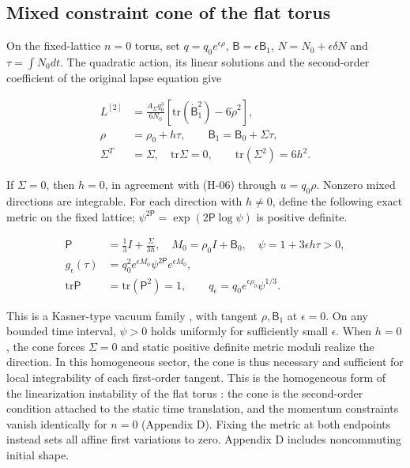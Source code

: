 \subsection{Mixed constraint cone of the flat torus}

On the fixed-lattice $n=0$ torus, set $q=q_0e^{\epsilon\rho}$, $\mathsf B=\epsilon\mathsf B_1$, $N=N_0+\epsilon\delta N$ and $\tau=\int N_0dt$. The quadratic action, its linear solutions and the second-order coefficient of the original lapse equation give

\begin{equation}\tag{S-01}\label{eq:S-01}
\begin{aligned}
L^{[2]}&=\frac{A_{\Sigma}q_0^3}{6N_0}\left[\mathrm{tr}(\dot{\mathsf B}_1^2)-6\dot\rho^2\right],\\
\rho&=\rho_0+h\tau,\qquad \mathsf B_1=\mathsf B_0+\Sigma\tau,\\
\Sigma^T&=\Sigma,\quad\mathrm{tr}\Sigma=0,\qquad \mathrm{tr}(\Sigma^2)=6h^2.
\end{aligned}
\end{equation}

If $\Sigma=0$, then $h=0$, in agreement with (H-06) through $u=q_0\rho$. Nonzero mixed directions are integrable. For each direction with $h\ne0$, define the following exact metric on the fixed lattice; $\psi^{2\mathsf P}=\exp(2\mathsf P\log\psi)$ is positive definite.

\begin{equation}\tag{S-02}\label{eq:S-02}
\begin{aligned}
\mathsf P&=\tfrac13 I+\frac{\Sigma}{3h},\quad M_0=\rho_0I+\mathsf B_0,\quad \psi=1+3\epsilon h\tau>0,\\
g_{\epsilon}(\tau)&=q_0^2e^{\epsilon M_0}\psi^{2\mathsf P}e^{\epsilon M_0},\\
\mathrm{tr}\mathsf P&=\mathrm{tr}(\mathsf P^2)=1,\qquad
q_{\epsilon}=q_0e^{\epsilon\rho_0}\psi^{1/3}.
\end{aligned}
\end{equation}

This is a Kasner-type vacuum family \cite{Kasner1921}, with tangent $\rho,\mathsf B_1$ at $\epsilon=0$. On any bounded time interval, $\psi>0$ holds uniformly for sufficiently small $\epsilon$. When $h=0$, the cone forces $\Sigma=0$ and static positive definite metric moduli realize the direction. In this homogeneous sector, the cone is thus necessary and sufficient for local integrability of each first-order tangent. This is the homogeneous form of the linearization instability of the flat torus \cite{BrillDeser1973}: the cone is the second-order condition attached to the static time translation, and the momentum constraints vanish identically for $n=0$ (Appendix D). Fixing the metric at both endpoints instead sets all affine first variations to zero. Appendix D includes noncommuting initial shape.

